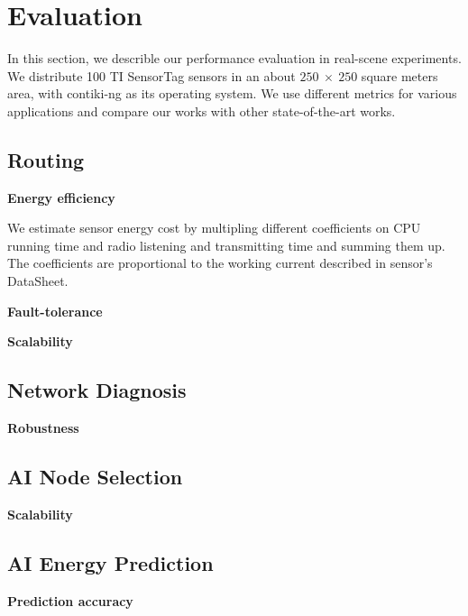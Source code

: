 \section{Evaluation}
\label{Eva}

In this section, we describle our performance evaluation in real-scene
experiments. We distribute 100 TI SensorTag sensors in an about $250~\times~250$
square meters area, with contiki-ng as its operating system. We use different
metrics for various applications and compare our works with other
state-of-the-art works.

\subsection{Routing}
\textbf{Energy efficiency}

We estimate sensor energy cost by multipling different coefficients on CPU
running time and radio listening and transmitting time and summing them up. The
coefficients are proportional to the working current described in sensor's
DataSheet.

\textbf{Fault-tolerance}

\textbf{Scalability}

\subsection{Network Diagnosis}
\textbf{Robustness}

\subsection{AI Node Selection}
\textbf{Scalability}

\subsection{AI Energy Prediction}
\textbf{Prediction accuracy}


